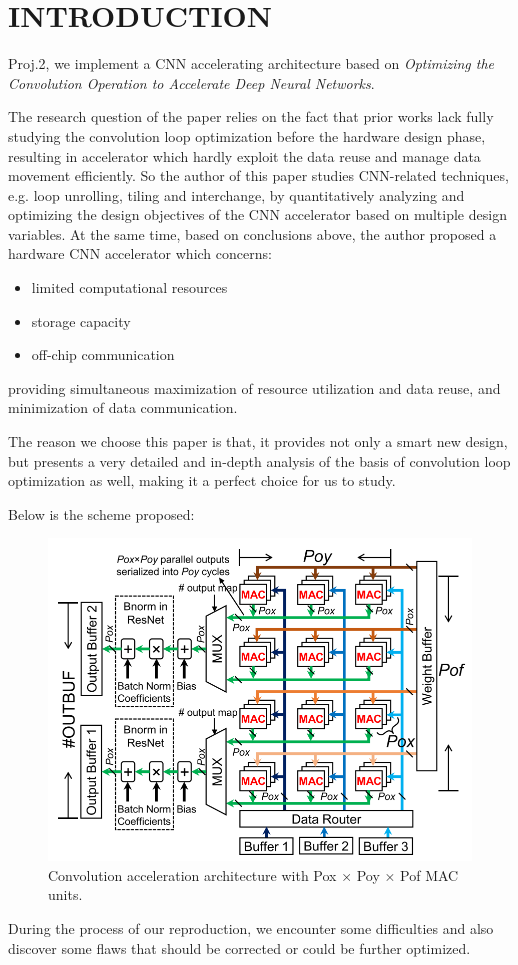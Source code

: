 \section{INTRODUCTION}

 Proj.2, we implement a CNN accelerating architecture based on \textit{Optimizing the Convolution Operation to Accelerate Deep Neural Networks}\cite{maOptimizingConvolutionOperation2018}.

The research question of the paper relies on the fact that prior works lack fully studying the convolution loop optimization before the hardware design phase, resulting in accelerator which hardly exploit the data reuse and manage data movement efficiently. So the author of this paper studies CNN-related techniques, e.g. loop unrolling, tiling and interchange, by quantitatively analyzing and optimizing the design objectives of the CNN accelerator based on multiple design variables. At the same time, based on conclusions above, the author proposed a hardware CNN accelerator which concerns:

\begin{itemize}
    \item limited computational resources
    \item storage capacity
    \item off-chip communication
\end{itemize}
providing simultaneous maximization of resource utilization and data reuse, and minimization of data communication.

The reason we choose this paper is that, it provides not only a smart new design, but presents a very detailed and in-depth analysis of the basis of convolution loop optimization as well, making it a perfect choice for us to study.

Below is the scheme proposed:

\begin{figure}[!htb]
    \centering
    \includegraphics[width=0.9\columnwidth]{../figures/Arch.png}
    \caption{Convolution acceleration architecture with Pox × Poy × Pof MAC units.}
    \label{fig:Arch}
\end{figure}

During the process of our reproduction, we encounter some difficulties and also discover some flaws that should be corrected or could be further optimized.